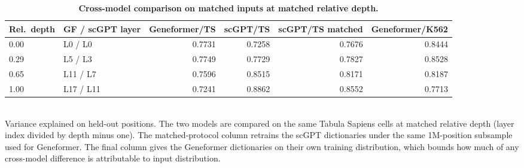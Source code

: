\begin{table}[htbp]
\centering
\caption{\textbf{Cross-model comparison on matched inputs at matched relative depth.}}
\label{tab:crossmodel}
\smallskip
\small
\begin{tabular}{llrrrr}
\toprule
Rel.\ depth & GF / scGPT layer & Geneformer/TS & scGPT/TS & scGPT/TS matched & Geneformer/K562 \\
\midrule
0.00 & L0 / L0 & 0.7731 & 0.7258 & 0.7676 & 0.8444 \\
0.29 & L5 / L3 & 0.7749 & 0.7729 & 0.7827 & 0.8528 \\
0.65 & L11 / L7 & 0.7596 & 0.8515 & 0.8171 & 0.8187 \\
1.00 & L17 / L11 & 0.7241 & 0.8862 & 0.8552 & 0.7713 \\
\bottomrule
\end{tabular}
\\[2pt]
\footnotesize Variance explained on held-out positions. The two models are compared on the same Tabula Sapiens cells at matched relative depth (layer index divided by depth minus one). The matched-protocol column retrains the scGPT dictionaries under the same 1M-position subsample used for Geneformer. The final column gives the Geneformer dictionaries on their own training distribution, which bounds how much of any cross-model difference is attributable to input distribution.
\end{table}
